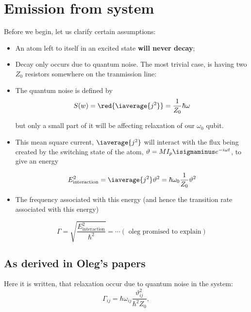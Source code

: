 
\section{Emission from system} 
Before we begin, let us clarify certain assumptions:
\begin{itemize}
\item An atom left to itself in an excited state \textbf{will never decay};
\item Decay only  occurs due to quantum  noise. The most trivial  case, is having
  two $ Z_0 $ resistors somewhere on the tranmission line:
 	
 	
\item The quantum noise \textbf{}
  is defined by
  \begin{equation}\label{key}
    S(w) = \red{\iaverage{j^2}} = \frac{1}{Z_0}\hbar\omega
  \end{equation}
 	
  \noindent but  only a  small part  of it  will be  affecting relaxation  of our
  $ \omega_0 $ qubit.
 	
 	
\item This  mean square current, $  \iaverage{j^2} $ will interact  with the flux
  being     created     by    the     switching     state     of    the     atom,
  $ \vartheta = MI_p\isigmaminus e^{-i\omega t} $, to give an energy
	
	\begin{equation}\label{key}
          E_\text{interaction}^2 = \iaverage{j^2}\vartheta^2 = \hbar\omega_0\frac{1}{Z_0}\vartheta^2
	\end{equation}
	
      \item The frequency  associated with this energy (and  hence the transition
        rate associated with this energy)
	
	\begin{equation}\label{key}
          \Gamma = \sqrt{\frac{E_\text{interaction}^2}{\hbar^2}} = \cdots (\text{ oleg promised to explain})
	\end{equation}
      \end{itemize}

 \subsection{As derived in Oleg's papers \cite{abdumalikov2010}\cite{Astafiev2010}}
 Here it is written, that relaxation occur due to quantum noise in the system:
 \begin{equation}\label{key}
   \Gamma_{ij} = \hbar\omega_{ij}\frac{\vartheta_{ij}^2}{\hbar^2Z_0},
 \end{equation}

